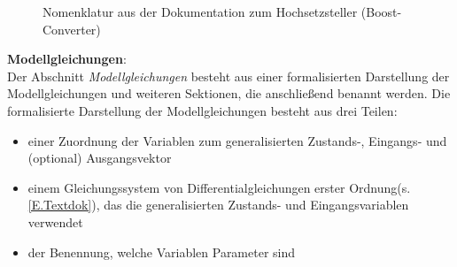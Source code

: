 \begin{figure}[H]
	\centering
	\caption{Nomenklatur aus der Dokumentation zum Hochsetzsteller (Boost-Converter)}
	\label{fig:BspDok_Nomenclature}
\end{figure}
%
\textbf{Modellgleichungen}:\\
Der Abschnitt \textit{Modellgleichungen} besteht aus einer formalisierten Darstellung der Modellgleichungen und weiteren Sektionen, die anschließend benannt werden. Die formalisierte Darstellung der Modellgleichungen besteht aus drei Teilen:  
\begin{itemize}[label=$\bullet$]
	\item einer Zuordnung der Variablen zum generalisierten Zustands-, Eingangs- und (optional) Ausgangsvektor
	\item einem Gleichungssystem von Differentialgleichungen erster Ordnung(s. \ref{E.Textdok}), das die generalisierten Zustands- und Eingangsvariablen verwendet
	\item der Benennung, welche Variablen Parameter sind
\end{itemize} 

